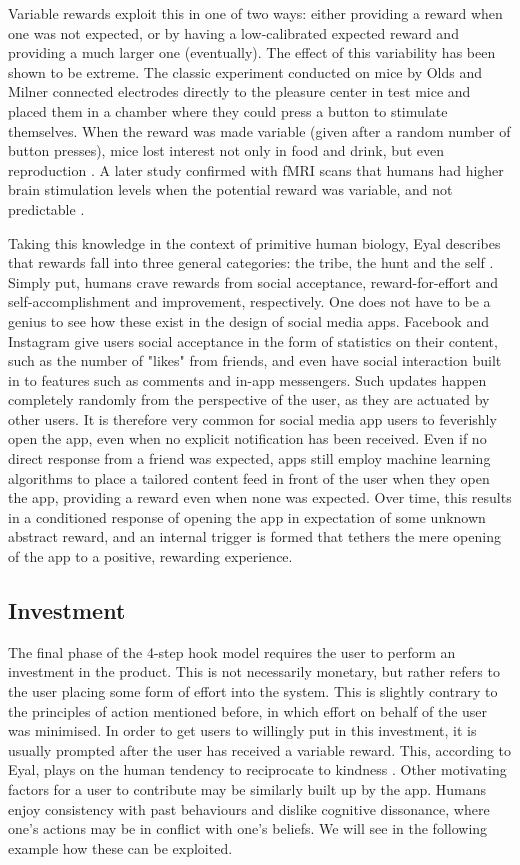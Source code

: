 Variable rewards exploit this in one of two ways: either providing a reward when one was not expected, or by having a low-calibrated expected reward and providing a much larger one (eventually). The effect of this variability has been shown to be extreme. The classic experiment conducted on mice by Olds and Milner connected electrodes directly to the pleasure center in test mice and placed them in a chamber where they could press a button to stimulate themselves. When the reward was made variable (given after a random number of button presses), mice lost interest not only in food and drink, but even reproduction \cite{olds1954positive}. A later study confirmed with fMRI scans that humans had higher brain stimulation levels when the potential reward was variable, and not predictable \cite{berns2001predictability}.

Taking this knowledge in the context of primitive human biology, Eyal describes that rewards fall into three general categories: the tribe, the hunt and the self \cite{eyal2014hooked}. Simply put, humans crave rewards from social acceptance, reward-for-effort and self-accomplishment and improvement, respectively. One does not have to be a genius to see how these exist in the design of social media apps. Facebook and Instagram give users social acceptance in the form of statistics on their content, such as the number of "likes" from friends, and even have social interaction built in to features such as comments and in-app messengers. Such updates happen completely randomly from the perspective of the user, as they are actuated by other users. It is therefore very common for social media app users to feverishly open the app, even when no explicit notification has been received. Even if no direct response from a friend was expected, apps still employ machine learning algorithms to place a tailored content feed in front of the user when they open the app, providing a reward even when none was expected. Over time, this results in a conditioned response of opening the app in expectation of some unknown abstract reward, and an internal trigger is formed that tethers the mere opening of the app to a positive, rewarding experience.

\subsection{Investment}
The final phase of the 4-step hook model requires the user to perform an investment in the product. This is not necessarily monetary, but rather refers to the user placing some form of effort into the system. This is slightly contrary to the principles of action mentioned before, in which effort on behalf of the user was minimised. In order to get users to willingly put in this investment, it is usually prompted after the user has received a variable reward. This, according to Eyal, plays on the human tendency to reciprocate to kindness \cite{eyal2014hooked}. Other motivating factors for a user to contribute may be similarly built up by the app. Humans enjoy consistency with past behaviours and dislike cognitive dissonance, where one's actions may be in conflict with one's beliefs. We will see in the following example how these can be exploited.

